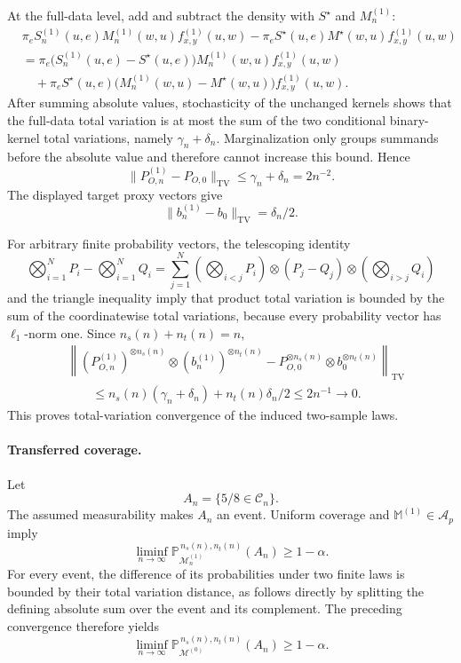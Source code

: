 At the full-data level, add and subtract the density with
\(S^\star\) and \(M^{(1)}_n\):
\[
\begin{split}
&\pi_eS^{(1)}_n(u,e)M^{(1)}_n(w,u)f^{(1)}_{x,y}(u,w)
-\pi_eS^\star(u,e)M^\star(w,u)f^{(1)}_{x,y}(u,w)\\
&=\pi_e\bigl(S^{(1)}_n(u,e)-S^\star(u,e)\bigr)
M^{(1)}_n(w,u)f^{(1)}_{x,y}(u,w)\\
&\quad+\pi_eS^\star(u,e)
\bigl(M^{(1)}_n(w,u)-M^\star(w,u)\bigr)
f^{(1)}_{x,y}(u,w).
\end{split}
\]
After summing absolute values, stochasticity of the unchanged kernels shows that the full-data total variation is at most the sum of the two conditional binary-kernel total variations, namely \(\gamma_n+\delta_n\). Marginalization only groups summands before the absolute value and therefore cannot increase this bound. Hence
\[
\lVert P^{(1)}_{O,n}-P_{O,0}\rVert_{\mathrm{TV}}
\le\gamma_n+\delta_n=2n^{-2}.
\]
The displayed target proxy vectors give
\[
\lVert b^{(1)}_n-b_0\rVert_{\mathrm{TV}}=\delta_n/2.
\]

For arbitrary finite probability vectors, the telescoping identity
\[
\bigotimes_{i=1}^N P_i-\bigotimes_{i=1}^N Q_i
=
\sum_{j=1}^N
\left(\bigotimes_{i<j}P_i\right)\otimes(P_j-Q_j)\otimes
\left(\bigotimes_{i>j}Q_i\right)
\]
and the triangle inequality imply that product total variation is bounded by the sum of the coordinatewise total variations, because every probability vector has \(\ell_1\)-norm one. Since
\(n_s(n)+n_t(n)=n\),
\[
\begin{split}
&\left\lVert
(P^{(1)}_{O,n})^{\otimes n_s(n)}
\otimes(b^{(1)}_n)^{\otimes n_t(n)}
-
P_{O,0}^{\otimes n_s(n)}
\otimes b_0^{\otimes n_t(n)}
\right\rVert_{\mathrm{TV}}\\
&\qquad\le
n_s(n)(\gamma_n+\delta_n)+n_t(n)\delta_n/2
\le2n^{-1}\longrightarrow0.
\end{split}
\]
This proves total-variation convergence of the induced two-sample laws.

\paragraph{Transferred coverage.}
Let
\[
A_n=\{5/8\in\mathcal C_n\}.
\]
The assumed measurability makes \(A_n\) an event. Uniform coverage and
\(\mathbb M^{(1)}\in\mathcal A_p\) imply
\[
\liminf_{n\to\infty}
\mathbb P_{\mathcal M^{(1)}_n}^{\,n_s(n),n_t(n)}(A_n)
\ge1-\alpha.
\]
For every event, the difference of its probabilities under two finite laws is bounded by their total variation distance, as follows directly by splitting the defining absolute sum over the event and its complement. The preceding convergence therefore yields
\[
\liminf_{n\to\infty}
\mathbb P_{\mathcal M^{(0)}}^{\,n_s(n),n_t(n)}(A_n)
\ge1-\alpha. \tag{1}
\]


